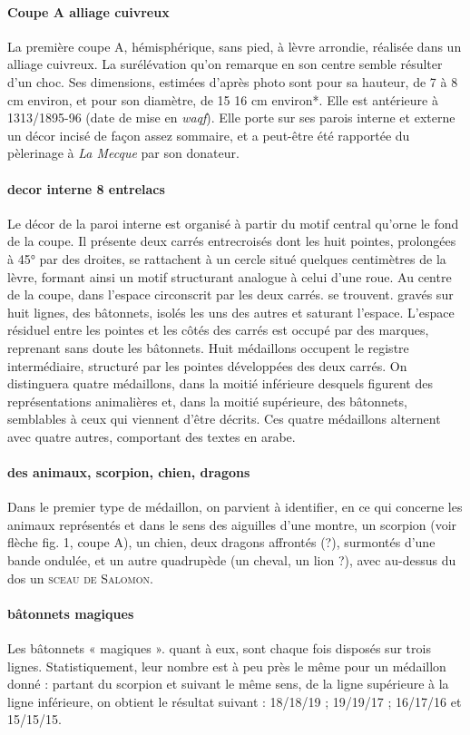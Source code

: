 \paragraph{Coupe A alliage cuivreux}
La première coupe A, hémisphérique, sans pied, à lèvre arrondie, réalisée dans un alliage cuivreux. La surélévation qu'on remarque en son centre semble résulter d'un choc. Ses dimensions, estimées d'après photo sont pour sa hauteur, de 7 à 8 cm environ, et pour son diamètre, de 15 16 cm environ*. Elle est antérieure à 1313/1895-96 (date de mise en \textit{waqf}). Elle porte sur ses parois interne et externe un décor incisé de façon assez sommaire, et a peut-être été rapportée du pèlerinage à \textit{La Mecque} par son donateur.


\paragraph{decor interne 8 entrelacs}
Le décor de la paroi interne est organisé à partir du motif central qu'orne le fond de la coupe. Il présente deux carrés entrecroisés dont les huit pointes, prolongées à 45° par des droites, se rattachent à un cercle situé quelques centimètres de la lèvre, formant ainsi un motif structurant analogue à celui d'une roue. Au centre de la coupe, dans l'espace circonscrit par les deux carrés. se trouvent. gravés sur huit lignes, des bâtonnets, isolés les uns des autres et saturant l'espace. L'espace résiduel entre les pointes et les côtés des carrés est occupé par des marques, reprenant sans doute les bâtonnets. Huit médaillons occupent le registre intermédiaire, structuré par les pointes développées des deux carrés. On distinguera quatre médaillons, dans la moitié inférieure desquels figurent des représentations animalières et, dans la moitié supérieure, des bâtonnets, semblables à ceux qui viennent d'être décrits. Ces quatre médaillons alternent avec quatre autres, comportant des textes en arabe. 
\paragraph{des animaux, scorpion, chien, dragons}
Dans le premier type de médaillon, on parvient à identifier, en ce qui concerne les animaux représentés et dans le sens des aiguilles d'une montre, un scorpion (voir flèche fig. 1, coupe A), un chien, deux dragons affrontés (?), surmontés d'une bande ondulée, et un autre quadrupède (un cheval, un lion ?), avec au-dessus du dos un \textsc{sceau de Salomon}. 
\paragraph{bâtonnets magiques}
Les bâtonnets « magiques ». quant à eux, sont chaque fois disposés sur trois lignes. Statistiquement, leur nombre est à peu près le même pour un médaillon donné : partant du scorpion et suivant le même sens, de la ligne supérieure à la ligne inférieure, on obtient le résultat suivant : 18/18/19 ; 19/19/17 ; 16/17/16 et 15/15/15.
